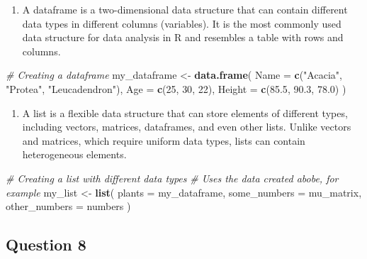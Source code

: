 \documentclass[
  10t,
]{article}
\newenvironment{Shaded}{\begin{snugshade}}{\end{snugshade}}
\newcommand{\AttributeTok}[1]{\textcolor[rgb]{0.13,0.29,0.53}{#1}}
\newcommand{\CommentTok}[1]{\textcolor[rgb]{0.56,0.35,0.01}{\textit{#1}}}
\newcommand{\DecValTok}[1]{\textcolor[rgb]{0.00,0.00,0.81}{#1}}
\newcommand{\FloatTok}[1]{\textcolor[rgb]{0.00,0.00,0.81}{#1}}
\newcommand{\FunctionTok}[1]{\textcolor[rgb]{0.13,0.29,0.53}{\textbf{#1}}}
\newcommand{\NormalTok}[1]{#1}
\newcommand{\OtherTok}[1]{\textcolor[rgb]{0.56,0.35,0.01}{#1}}
\newcommand{\StringTok}[1]{\textcolor[rgb]{0.31,0.60,0.02}{#1}}
\providecommand{\tightlist}{%
  \setlength{\itemsep}{0pt}\setlength{\parskip}{0pt}}\usepackage{longtable,booktabs,array}
\begin{document}
\begin{enumerate}
\def\labelenumi{(\alph{enumi})}
\setcounter{enumi}{2}
\tightlist
\item
  A dataframe is a two-dimensional data structure that can contain
  different data types in different columns (variables). It is the most
  commonly used data structure for data analysis in R and resembles a
  table with rows and columns.
\end{enumerate}

\begin{Shaded}
\begin{Highlighting}[]
\CommentTok{\# Creating a dataframe}
\NormalTok{my\_dataframe }\OtherTok{\textless{}{-}} \FunctionTok{data.frame}\NormalTok{(}
  \AttributeTok{Name =} \FunctionTok{c}\NormalTok{(}\StringTok{"Acacia"}\NormalTok{, }\StringTok{"Protea"}\NormalTok{, }\StringTok{"Leucadendron"}\NormalTok{),}
  \AttributeTok{Age =} \FunctionTok{c}\NormalTok{(}\DecValTok{25}\NormalTok{, }\DecValTok{30}\NormalTok{, }\DecValTok{22}\NormalTok{),}
  \AttributeTok{Height =} \FunctionTok{c}\NormalTok{(}\FloatTok{85.5}\NormalTok{, }\FloatTok{90.3}\NormalTok{, }\FloatTok{78.0}\NormalTok{)}
\NormalTok{)}
\end{Highlighting}
\end{Shaded}

\begin{enumerate}
\def\labelenumi{(\alph{enumi})}
\setcounter{enumi}{3}
\tightlist
\item
  A list is a flexible data structure that can store elements of
  different types, including vectors, matrices, dataframes, and even
  other lists. Unlike vectors and matrices, which require uniform data
  types, lists can contain heterogeneous elements.
\end{enumerate}

\begin{Shaded}
\begin{Highlighting}[]
\CommentTok{\# Creating a list with different data types}
\CommentTok{\# Uses the data created abobe, for example}
\NormalTok{my\_list }\OtherTok{\textless{}{-}} \FunctionTok{list}\NormalTok{(}
  \AttributeTok{plants =}\NormalTok{ my\_dataframe,}
  \AttributeTok{some\_numbers =}\NormalTok{ mu\_matrix,}
  \AttributeTok{other\_numbers =}\NormalTok{ numbers}
\NormalTok{  )}
\end{Highlighting}
\end{Shaded}

\subsection{Question 8}\label{question-8}
\end{document}
